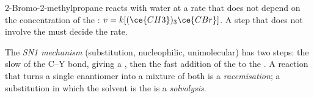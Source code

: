 2-Bromo-2-methylpropane reacts with water at a rate that does not depend
on the concentration of the : $v = k[(\ce{CH3})_3\ce{CBr}]$. A
step that does not involve the  must decide the rate.

\begin{definition}\label{def:b1:nucleophilic-substitution:sn1}
The \emph{SN1 mechanism} (substitution,
nucleophilic, unimolecular) has two steps: the slow  of the
C--Y bond, giving a , then the fast addition of the
 to the . A reaction that turns a single
enantiomer into a mixture of both is a \emph{racemisation};
a substitution in which the solvent is the  is a
\emph{solvolysis}.
\end{definition}

